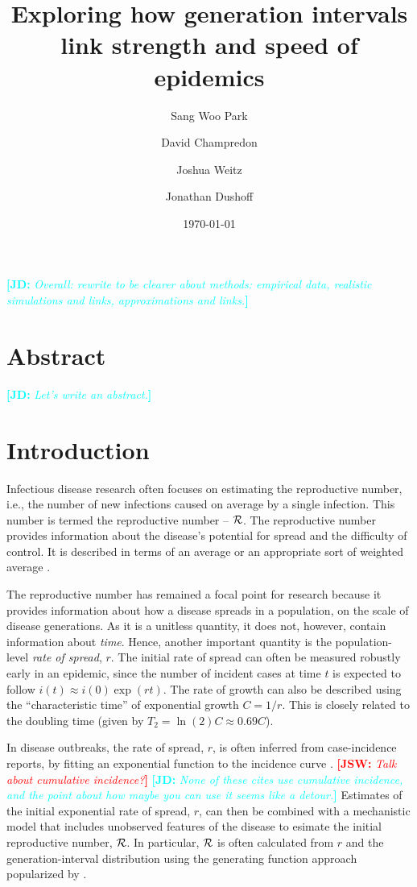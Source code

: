 \documentclass[12pt]{article}
\title{Exploring how generation intervals link strength and speed of epidemics}
\author{Sang Woo Park \and David Champredon \and Joshua Weitz \and Jonathan Dushoff}
\date{\today}
\newcommand{\RR}{\ensuremath{{\cal R}}}
\newcommand{\Tc}{\ensuremath{C}}
\newcommand{\comment}[3]{\textcolor{#1}{\textbf{[#2: }\textit{#3}\textbf{]}}}
\newcommand{\jd}[1]{\comment{cyan}{JD}{#1}}
\newcommand{\jsw}[1]{\comment{red}{JSW}{#1}}
\begin{document}
\maketitle

\jd{Overall: rewrite to be clearer about methods: empirical data, realistic simulations and links, approximations and links.}

\section*{Abstract}

\jd{Let's write an abstract.}

\section{Introduction}

Infectious disease research often focuses on estimating the reproductive number, i.e., the number of new infections caused on average by a single infection.
This number is termed the reproductive number -- \RR.
The reproductive number provides information about the disease's potential for spread and the difficulty of control.
It is described in terms of an average \cite{AndeMay91} or an appropriate sort of weighted average \cite{DiekHees90}.

The reproductive number has remained a focal point for research because it provides information about how a disease spreads in a population, on the scale of disease generations.
As it is a unitless quantity, it does not, however, contain information about \emph{time}.
Hence, another important quantity is the population-level \emph{rate of spread}, $r$. The initial rate of spread can often be measured robustly early in an epidemic, since the number of incident cases at time $t$ is expected to follow $i(t) \approx i(0) \exp(r t)$. The rate of growth can also be described using the ``characteristic time'' of exponential growth $\Tc = 1/r$. This is closely related to the doubling time (given by $T_2 = \ln(2) \Tc \approx 0.69 \Tc$).

In disease outbreaks, the rate of spread, $r$, is often inferred from case-incidence reports, by fitting an exponential function to the incidence curve \cite{MillRobi04, NishCast09, MaJDush14}.
\jsw{Talk about cumulative incidence?}
\jd{None of these cites use cumulative incidence, and the point about how maybe you can use it seems like a detour.}
Estimates of the initial exponential rate of spread, $r$, can then be combined with a mechanistic model that includes unobserved features of the disease to esimate the initial reproductive number, \RR.
In particular, $\RR$ is often calculated from $r$ and the generation-interval distribution using the generating function approach popularized by \cite{WallLips07}.
\end{document}
